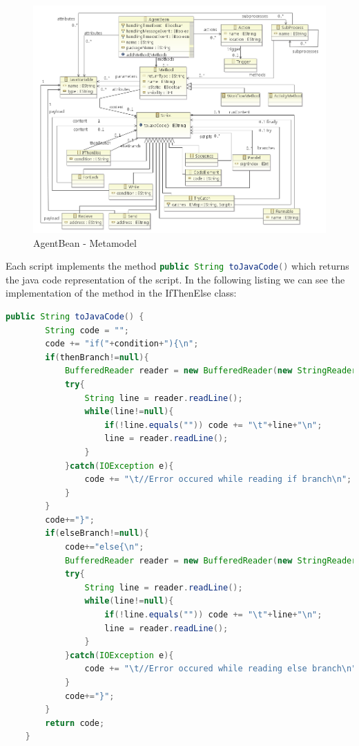 \begin{figure}[h]
	\centering\includegraphics[width=1.0\textwidth]{images/agentBean_metamodel.png}
	\caption{AgentBean - Metamodel}
	\label{fig:agentbean_metamodel}
\end{figure}

Each script implements the method \lstinline[language=Java]{public String toJavaCode()} which returns the java code representation of the script.
In the following listing we can see the implementation of the method in the IfThenElse class:
\begin{lstlisting}[language = Java, caption = toJavaCode() implementation in the IfThenElse class]
	public String toJavaCode() {
		String code = "";
		code += "if("+condition+"){\n";
		if(thenBranch!=null){
			BufferedReader reader = new BufferedReader(new StringReader(thenBranch.toJavaCode()));
			try{
				String line = reader.readLine();
				while(line!=null){
					if(!line.equals("")) code += "\t"+line+"\n";
					line = reader.readLine();
				}
			}catch(IOException e){
				code += "\t//Error occured while reading if branch\n";
			}
		}
		code+="}";
		if(elseBranch!=null){
			code+="else{\n";
			BufferedReader reader = new BufferedReader(new StringReader(elseBranch.toJavaCode()));
			try{
				String line = reader.readLine();
				while(line!=null){
					if(!line.equals("")) code += "\t"+line+"\n";
					line = reader.readLine();
				}
			}catch(IOException e){
				code += "\t//Error occured while reading else branch\n";
			}
			code+="}";
		}
		return code;
	}
\end{lstlisting}

